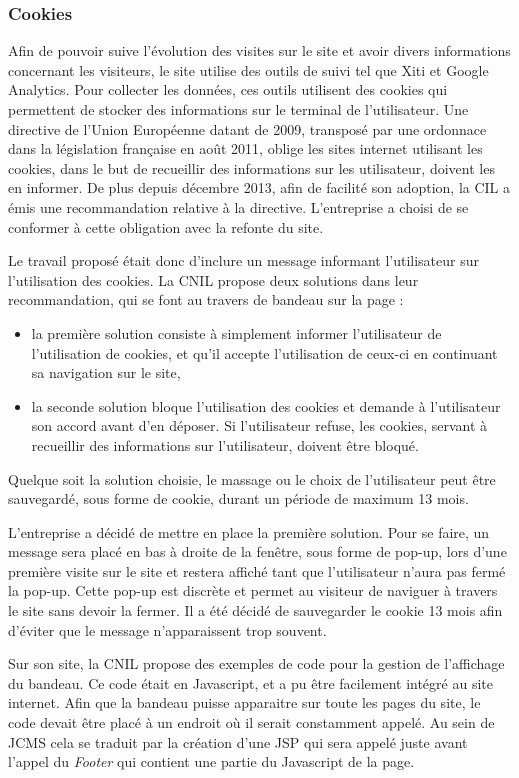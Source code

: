 \documentclass[12pt,a4paper]{article}
\begin{document}
\subsubsection{Cookies}
Afin de pouvoir suive l'évolution des visites sur le site et avoir divers informations concernant les visiteurs, le site utilise des outils de suivi tel que Xiti et Google Analytics. Pour collecter les données, ces outils utilisent des cookies qui permettent de stocker des informations sur le terminal de l'utilisateur. Une directive de l'Union Européenne datant de 2009, transposé par une ordonnace dans la législation française en août 2011, oblige les sites internet utilisant les cookies, dans le but de recueillir des informations sur les utilisateur, doivent les en informer. De plus depuis décembre 2013, afin de facilité son adoption, la CIL a émis une recommandation relative à la directive. L'entreprise a choisi de se conformer à cette obligation avec la refonte du site.\par 
Le travail proposé était donc d'inclure un message informant l'utilisateur sur l'utilisation des cookies. La CNIL propose deux solutions dans leur recommandation, qui se font au travers de bandeau sur la page :
\begin{itemize}
\item la première solution consiste à simplement informer l'utilisateur de l'utilisation de cookies, et qu'il accepte l'utilisation de ceux-ci en continuant sa navigation sur le site,
\item la seconde solution bloque l'utilisation des cookies et demande à l'utilisateur son accord avant d'en déposer. Si l'utilisateur refuse, les cookies, servant à recueillir des informations sur l'utilisateur, doivent être bloqué.
\end{itemize}\par 
Quelque soit la solution choisie, le massage ou le choix de l'utilisateur peut être sauvegardé, sous forme de cookie, durant un période de maximum 13 mois.\par 
\bigskip
L'entreprise a décidé de mettre en place la première solution. Pour se faire, un message sera placé en bas à droite de la fenêtre, sous forme de pop-up, lors d'une première visite sur le site et restera affiché tant que l'utilisateur n'aura pas fermé la pop-up. Cette pop-up est discrète et permet au visiteur de naviguer à travers le site sans devoir la fermer. Il a été décidé de sauvegarder le cookie 13 mois afin d'éviter que le message n'apparaissent trop souvent.\par 
Sur son site, la CNIL propose des exemples de code pour la gestion de l'affichage du bandeau. Ce code était en Javascript, et a pu être facilement intégré au site internet. Afin que la bandeau puisse apparaitre sur toute les pages du site, le code devait être placé à un endroit où il serait constamment appelé. Au sein de \gls{JCMS} cela se traduit par la création d'une JSP qui sera appelé juste avant l'appel du \textit{Footer} qui contient une partie du Javascript de la page.\par
\end{document}
